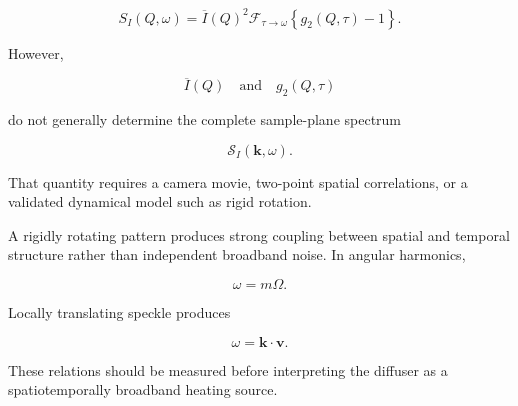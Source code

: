 \documentclass[11pt]{article}
\newcommand{\SII}{\mathcal{S}_{I}}
\newcommand{\kvec}{\mathbf{k}}
\begin{document}
\begin{equation}
    S_I(Q,\omega)
    =
    \overline{I}(Q)^2
    \mathcal{F}_{\tau\rightarrow\omega}
    \left\{
        g_2(Q,\tau)-1
    \right\}.
\end{equation}

However,

\begin{equation}
    \overline{I}(Q)
    \quad\text{and}\quad
    g_2(Q,\tau)
\end{equation}

do not generally determine the complete sample-plane spectrum

\begin{equation}
    \SII(\kvec,\omega).
\end{equation}

That quantity requires a camera movie, two-point spatial correlations, or a
validated dynamical model such as rigid rotation.

A rigidly rotating pattern produces strong coupling between spatial and
temporal structure rather than independent broadband noise. In angular
harmonics,

\begin{equation}
    \omega=m\Omega.
\end{equation}

Locally translating speckle produces

\begin{equation}
    \omega=\kvec\cdot\mathbf{v}.
\end{equation}

These relations should be measured before interpreting the diffuser as a
spatiotemporally broadband heating source.
\end{document}
